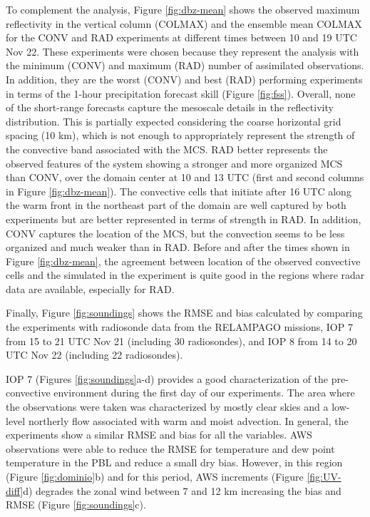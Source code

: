 \documentclass[preprint, 3p, authoryear,review, 12pt]{elsarticle} %
\begin{document}
To complement the analysis, Figure \ref{fig:dbz-mean} shows the observed maximum reflectivity in the vertical column (COLMAX) and the ensemble mean COLMAX for the CONV and RAD experiments at different times between 10 and 19 UTC Nov 22. These experiments were chosen because they represent the analysis with the minimum (CONV) and maximum (RAD) number of assimilated observations. In addition, they are the worst (CONV) and best (RAD) performing experiments in terms of the 1-hour precipitation forecast skill (Figure \ref{fig:fss}). Overall, none of the short-range forecasts capture the mesoscale details in the reflectivity distribution. This is partially expected considering the coarse horizontal grid spacing (10 km), which is not enough to appropriately represent the strength of the convective band associated with the MCS. RAD better represents the observed features of the system showing a stronger and more organized MCS than CONV, over the domain center at 10 and 13 UTC (first and second columns in Figure \ref{fig:dbz-mean}). The convective cells that initiate after 16 UTC along the warm front in the northeast part of the domain are well captured by both experiments but are better represented in terms of strength in RAD. In addition, CONV captures the location of the MCS, but the convection seems to be less organized and much weaker than in RAD. Before and after the times shown in Figure \ref{fig:dbz-mean}, the agreement between location of the observed convective cells and the simulated in the experiment is quite good in the regions where radar data are available, especially for RAD.

Finally, Figure \ref{fig:soundings} shows the RMSE and bias calculated by comparing the experiments with radiosonde data from the RELAMPAGO missions, IOP 7 from 15 to 21 UTC Nov 21 (including 30 radiosondes), and IOP 8 from 14 to 20 UTC Nov 22 (including 22 radiosondes).

IOP 7 (Figures \ref{fig:soundings}a-d) provides a good characterization of the pre-convective environment during the first day of our experiments. The area where the observations were taken was characterized by mostly clear skies and a low-level northerly flow associated with warm and moist advection. In general, the experiments show a similar RMSE and bias for all the variables. AWS observations were able to reduce the RMSE for temperature and dew point temperature in the PBL and reduce a small dry bias. However, in this region (Figure \ref{fig:dominio}b) and for this period, AWS increments (Figure \ref{fig:UV-diff}d) degrades the zonal wind between 7 and 12 km increasing the bias and RMSE (Figure \ref{fig:soundings}c).
\end{document}
